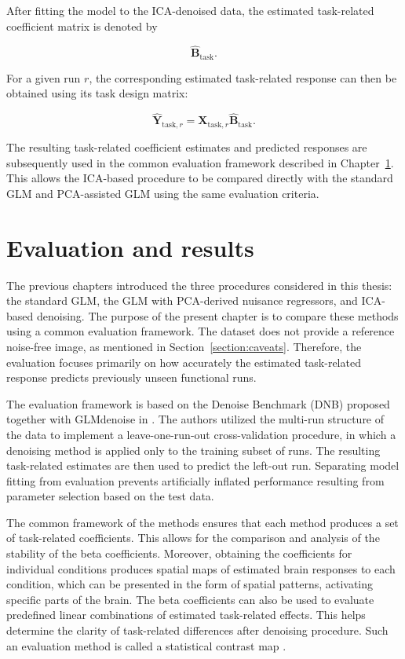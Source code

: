 \documentclass[english]{pwr_wmat_praca_dyplomowa}
\theoremstyle{definition}
\theoremstyle{remark}
\begin{document}
After fitting the model to the ICA-denoised data, the estimated task-related coefficient matrix is denoted by

\begin{equation}
    \widehat{\mathbf{B}}_{\mathrm{task}}.
\end{equation}

For a given run $r$, the corresponding estimated task-related response can then be obtained using its task design matrix:

\begin{equation}
    \widehat{\mathbf{Y}}_{\mathrm{task},r}
    =
    \mathbf{X}_{\mathrm{task},r}
    \widehat{\mathbf{B}}_{\mathrm{task}}.
\end{equation}

The resulting task-related coefficient estimates and predicted responses are subsequently used in the common evaluation framework described in Chapter~\ref{chapter:evaluation}. This allows the ICA-based procedure to be compared directly with the standard GLM and PCA-assisted GLM using the same evaluation criteria.


\chapter{Evaluation and results}
\label{chapter:evaluation}

The previous chapters introduced the three procedures considered in this thesis: the standard GLM, the GLM with PCA-derived nuisance regressors, and ICA-based denoising. The purpose of the present chapter is to compare these methods using a common evaluation framework. The dataset does not provide a reference noise-free image, as mentioned in Section~\ref{section:caveats}. Therefore, the evaluation focuses primarily on how accurately the estimated task-related response predicts previously unseen functional runs.

The evaluation framework is based on the Denoise Benchmark (DNB) proposed together with GLMdenoise in \cite{glm-denoise}. The authors utilized the multi-run structure of the data to implement a leave-one-run-out cross-validation procedure, in which a denoising method is applied only to the training subset of runs. The resulting task-related estimates are then used to predict the left-out run. Separating model fitting from evaluation prevents artificially inflated performance resulting from parameter selection based on the test data.

The common framework of the methods ensures that each method produces a set of task-related coefficients. This allows for the comparison and analysis of the stability of the beta coefficients. Moreover, obtaining the coefficients for individual conditions produces spatial maps of estimated brain responses to each condition, which can be presented in the form of spatial patterns, activating specific parts of the brain. The beta coefficients can also be used to evaluate predefined linear combinations of estimated task-related effects. This helps determine the clarity of task-related differences after denoising procedure. Such an evaluation method is called a statistical contrast map \cite{tmaps}.
\end{document}
